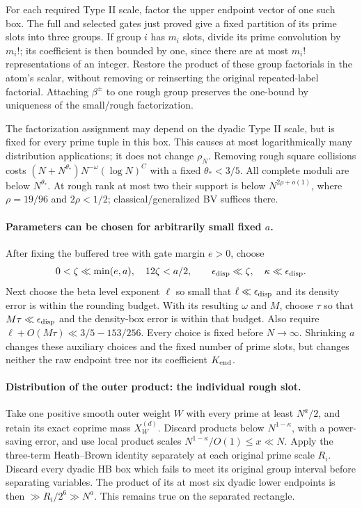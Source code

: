 For each required Type II scale, factor the upper endpoint vector of
one such box. The full and selected gates just proved give a fixed
partition of its prime slots into three groups. If group $i$ has $m_i$
slots, divide its prime convolution by $m_i!$; its coefficient is then
bounded by one, since there are at most $m_i!$ representations of an
integer. Restore the product of these group factorials in the atom's
scalar, without removing or reinserting the original repeated-label
factorial. Attaching $\beta^\pm$ to one rough group preserves the
one-bound by uniqueness of the small/rough factorization.

The factorization assignment may depend on the dyadic Type II scale,
but is fixed for every prime tuple in this box. This causes at most
logarithmically many distribution applications; it does not change
$\rho_N$. Removing rough square collisions costs
$(N+N^{\theta_*})N^{-\omega}(\log N)^C$ with a fixed $\theta_*<3/5$.
All complete moduli are below $N^{\theta_*}$. At rough rank at most
two their support is below $N^{2\rho+o(1)}$, where
$\rho=19/96$ and $2\rho<1/2$; classical/generalized BV suffices there.

\paragraph{Parameters can be chosen for arbitrarily small fixed $a$.}
After fixing the buffered tree with gate margin $e>0$, choose
\[
 0<\zeta\ll\min(e,a),\quad 12\zeta<a/2,\qquad
 \epsilon_{\rm disp}\ll\zeta,\quad \kappa\ll\epsilon_{\rm disp}.
\]
Next choose the beta level exponent $\ell$ so small that
$\ell\ll\epsilon_{\rm disp}$ and its density error is within the
rounding budget. With its resulting $\omega$ and $M$, choose $\tau$
so that $M\tau\ll\epsilon_{\rm disp}$ and the density-box error is
within that budget. Also require
$\ell+O(M\tau)\ll3/5-153/256$. Every choice is fixed before
$N\to\infty$. Shrinking $a$ changes these auxiliary choices and the
fixed number of prime slots, but changes neither the raw endpoint
tree nor its coefficient $K_{\rm end}$.

\paragraph{Distribution of the outer product: the individual rough slot.}
Take one positive smooth outer weight $W$ with every prime at least
$N^a/2$, and retain its exact coprime mass $X_W^{(d)}$.
Discard products below $N^{1-\kappa}$, with a power-saving error, and
use local product scales $N^{1-\kappa}/O(1)\le x\ll N$.
Apply the three-term Heath--Brown identity separately at each original
prime scale $R_i$. Discard every dyadic HB box which fails to meet
its original group interval before separating variables. The product
of its at most six dyadic lower endpoints is then
$\gg R_i/2^6\gg N^a$. This remains true on the separated rectangle.

